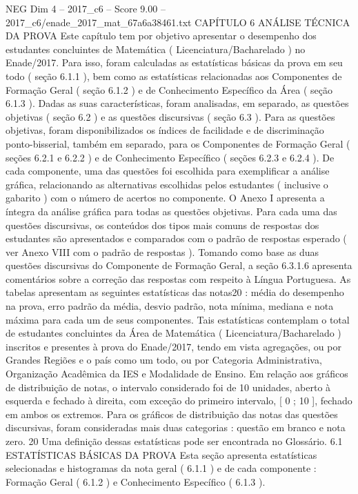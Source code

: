 \begin{textsample}{NEG Dim 4 – 2017\_c6 – Score 9.00 – 2017\_c6/enade\_2017\_mat\_67a6a38461.txt}  \label{ex:f4_neg_323}
CAPÍTULO 6 ANÁLISE TÉCNICA DA PROVA Este capítulo tem por objetivo apresentar o desempenho dos estudantes concluintes de Matemática ( Licenciatura/Bacharelado ) no Enade/2017.
Para isso, foram calculadas as estatísticas básicas da prova em seu todo ( seção 6.1.1 ), bem como as estatísticas relacionadas aos Componentes de Formação Geral ( seção 6.1.2 ) e de Conhecimento Específico da Área ( seção 6.1.3 ).
Dadas as suas características, foram analisadas, em separado, as questões objetivas ( seção 6.2 ) e as questões discursivas ( seção 6.3 ).
Para as questões objetivas, foram disponibilizados os índices de facilidade e de discriminação ponto-bisserial, também em separado, para os Componentes de Formação Geral ( seções 6.2.1 e 6.2.2 ) e de Conhecimento Específico ( seções 6.2.3 e 6.2.4 ).
De cada componente, uma das questões foi escolhida para exemplificar a análise gráfica, relacionando as alternativas escolhidas pelos estudantes ( inclusive o gabarito ) com o número de acertos no componente.
O Anexo I apresenta a íntegra da análise gráfica para todas as questões objetivas.
Para cada uma das questões discursivas, os conteúdos dos tipos mais comuns de respostas dos estudantes são apresentados e comparados com o padrão de respostas esperado ( ver Anexo VIII com o padrão de respostas ).
Tomando como base as duas questões discursivas do Componente de Formação Geral, a seção 6.3.1.6 apresenta comentários sobre a correção das respostas com respeito à Língua Portuguesa.
As tabelas apresentam as seguintes estatísticas das notas20 : média do desempenho na prova, erro padrão da média, desvio padrão, nota mínima, mediana e nota máxima para cada um de seus componentes.
Tais estatísticas contemplam o total de estudantes concluintes da Área de Matemática ( Licenciatura/Bacharelado ) inscritos e presentes à prova do Enade/2017, tendo em vista agregações, ou por Grandes Regiões e o país como um todo, ou por Categoria Administrativa, Organização Acadêmica da IES e Modalidade de Ensino.
Em relação aos gráficos de distribuição de notas, o intervalo considerado foi de 10 unidades, aberto à esquerda e fechado à direita, com exceção do primeiro intervalo, [ 0 ; 10 ], fechado em ambos os extremos.
Para os gráficos de distribuição das notas das questões discursivas, foram consideradas mais duas categorias : questão em branco e nota zero. 20 Uma definição dessas estatísticas pode ser encontrada no Glossário. 6.1 ESTATÍSTICAS BÁSICAS DA PROVA Esta seção apresenta estatísticas selecionadas e histogramas da nota geral ( 6.1.1 ) e de cada componente : Formação Geral ( 6.1.2 ) e Conhecimento Específico ( 6.1.3 ).

\end{textsample}
